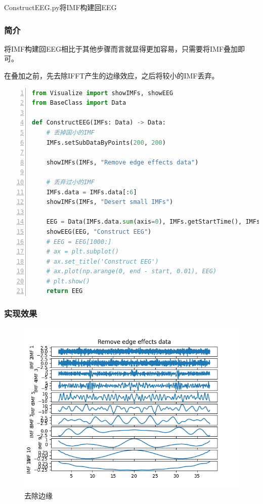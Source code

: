 \documentclass[cs4size,a4paper]{ctexart}
\numberwithin{equation}{section}
\numberwithin{table}{section}
\numberwithin{figure}{section}
\begin{document}
\colorbox{LetMeFlyGray}{ConstructEEG.py}将IMF构建回EEG

\subsubsection{简介}

将IMF构建回EEG相比于其他步骤而言就显得更加容易，只需要将IMF叠加即可。

在叠加之前，先去除IFFT产生的边缘效应，之后将较小的IMF丢弃。

\begin{lstlisting}[language={python},
numbers=left,
numberstyle=\tiny\monaco,
basicstyle=\footnotesize\monaco]
from Visualize import showIMFs, showEEG
from BaseClass import Data

def ConstructEEG(IMFs: Data) -> Data:
    # 丢掉国小的IMF
    IMFs.setSubDataByPoints(200, 200)

    showIMFs(IMFs, "Remove edge effects data")

    # 丢弃过小的IMF
    IMFs.data = IMFs.data[:6]
    showIMFs(IMFs, "Desert small IMFs")

    EEG = Data(IMFs.data.sum(axis=0), IMFs.getStartTime(), IMFs.getFPS())
    showEEG(EEG, "Construct EEG")
    # EEG = EEG[1000:]
    # ax = plt.subplot()
    # ax.set_title('Construct EEG')
    # ax.plot(np.arange(0, end - start, 0.01), EEG)
    # plt.show()
    return EEG

\end{lstlisting}

\subsubsection{实现效果}

\begin{figure}[H]
\small
\centering
\includegraphics{remove-edge.png}
\caption{去除边缘} \label{fig:remove-edge}
\end{figure}
\end{document}
